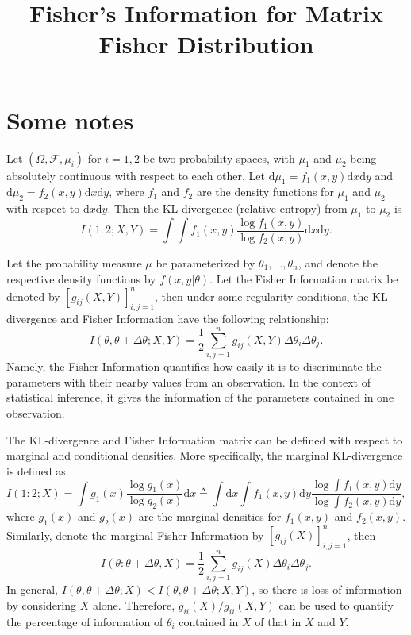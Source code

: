\documentclass[10pt]{article}
\title{\vspace{-4ex}\textbf{Fisher's Information for Matrix Fisher Distribution\vspace{-4ex}}}
\date{}
\newcommand{\diff}[1]{\ensuremath{\mathrm{d} #1}}
\begin{document}
\maketitle

\section{Some notes}

Let $(\Omega,\mathcal{F},\mu_i)$ for $i=1,2$ be two probability spaces, with $\mu_1$ and $\mu_2$ being absolutely continuous with respect to each other.
Let $\diff{\mu_1} = f_1(x,y)\diff{x}\diff{y}$ and $\diff{\mu_2} = f_2(x,y)\diff{x}\diff{y}$, where $f_1$ and $f_2$ are the density functions for $\mu_1$ and $\mu_2$ with respect to $\diff{x}\diff{y}$.
Then the KL-divergence (relative entropy) from $\mu_1$ to $\mu_2$ is
\begin{equation}
	I(1:2;X,Y) = \int\int f_1(x,y) \frac{\log f_1(x,y)}{\log f_2(x,y)} \diff{x}\diff{y}.
\end{equation}

Let the probability measure $\mu$ be parameterized by $\theta_1, \ldots, \theta_n$, and denote the respective density functions by $f(x,y|\theta)$.
Let the Fisher Information matrix be denoted by $[g_{ij}(X,Y)]_{i,j=1}^n$, then under some regularity conditions, the KL-divergence and Fisher Information have the following relationship:
\begin{equation}
	I(\theta,\theta+\Delta\theta;X,Y) = \frac{1}{2}\sum_{i,j=1}^{n} g_{ij}(X,Y)\Delta\theta_i\Delta\theta_j.
\end{equation}
Namely, the Fisher Information quantifies how easily it is to discriminate the parameters with their nearby values from an observation.
In the context of statistical inference, it gives the information of the parameters contained in one observation.

The KL-divergence and Fisher Information matrix can be defined with respect to marginal and conditional densities.
More specifically, the marginal KL-divergence is defined as
\begin{equation}
	I(1:2;X) = \int g_1(x)\frac{\log g_1(x)}{\log g_2(x)} \diff{x} \triangleq \int \diff{x} \int f_1(x,y) \diff{y} \frac{\log\int f_1(x,y) \diff{y}}{\log\int f_2(x,y) \diff{y}},
\end{equation}
where $g_1(x)$ and $g_2(x)$ are the marginal densities for $f_1(x,y)$ and $f_2(x,y)$.
Similarly, denote the marginal Fisher Information by $[g_{ij}(X)]_{i,j=1}^n$, then
\begin{equation}
	I(\theta:\theta+\Delta\theta,X) = \frac{1}{2}\sum_{i,j=1}^n g_{ij}(X) \Delta\theta_i \Delta\theta_j.
\end{equation}
In general, $I(\theta,\theta+\Delta\theta;X) < I(\theta,\theta+\Delta\theta;X,Y)$, so there is loss of information by considering $X$ alone.
Therefore, $g_{ii}(X)/g_{ii}(X,Y)$ can be used to quantify the percentage of information of $\theta_i$ contained in $X$ of that in $X$ and $Y$.
\end{document}

